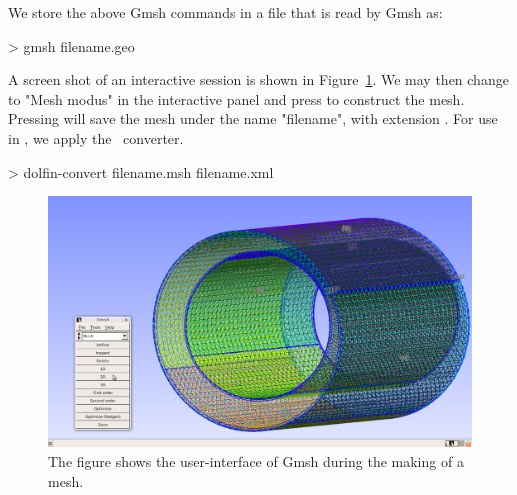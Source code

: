 We store the above Gmsh commands in a  file that is read by Gmsh as:
\begin{bash}
> gmsh filename.geo
\end{bash}
A screen shot of an interactive session is shown in
Figure~\ref{fig:Gmsh_mesh}.  We may then change to "Mesh modus" in the
interactive panel and press  to construct the
mesh. Pressing  will save the mesh under the name
"filename", with extension . For use in \dolfin, we apply
the \dolfin\ converter.

\begin{bash}
> dolfin-convert filename.msh filename.xml
\end{bash}

\begin{figure}
  \centering
  \includegraphics[width=\largefig]{chapters/hentschel/pdf/gmsh.pdf}
  \caption{The figure shows the user-interface of Gmsh during the making
    of a mesh.}
  \label{fig:Gmsh_mesh}
\end{figure}

